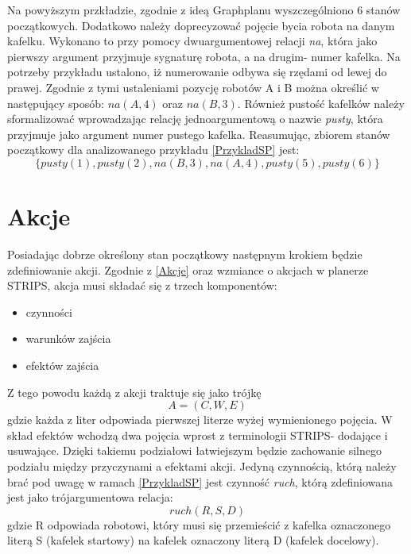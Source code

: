     Na powyższym przkładzie, zgodnie z ideą Graphplanu wyszczególniono 6 stanów początkowych. Dodatkowo należy doprecyzować pojęcie bycia robota na danym kafelku. Wykonano to 
    przy pomocy dwuargumentowej relacji \textit{na}, która jako pierwszy argument przyjmuje sygnaturę robota, a na drugim- numer kafelka. Na potrzeby przykładu ustalono, iż 
    numerowanie odbywa się rzędami od lewej do prawej. Zgodnie z tymi ustaleniami pozycję robotów A i B można określić w następujący sposób: \textit{$na(A,4)$} oraz 
    \textit{$na(B,3)$}. Również pustość kafelków należy sformalizować wprowadzając relację jednoargumentową o nazwie \textit{pusty}, która przyjmuje jako argument numer
    pustego kafelka. Reasumując, zbiorem stanów początkowy dla analizowanego przykładu \ref{PrzykladSP} jest: 
    \begin{equation}
        \{pusty(1),pusty(2),na(B,3),na(A,4),pusty(5),pusty(6)\}
        \label{ZbiorPoczatkowy}
    \end{equation}
\section{Akcje}
    \label{RozdzialAkcje}
    Posiadając dobrze określony stan początkowy następnym krokiem będzie zdefiniowanie akcji. Zgodnie z \ref{Akcje} oraz wzmiance o akcjach w planerze STRIPS,
    akcja musi składać się z trzech komponentów:
    \begin{itemize}
        \item czynności
        \item warunków zajścia
        \item efektów zajścia
    \end{itemize}
    Z tego powodu każdą z akcji traktuje się jako trójkę 
    \begin{equation}
        A=(C,W,E)
    \end{equation}
    gdzie każda z liter odpowiada pierwszej literze wyżej wymienionego pojęcia. 
    W skład efektów wchodzą dwa pojęcia wprost z terminologii STRIPS- dodające i usuwające. Dzięki takiemu podziałowi łatwiejszym będzie 
    zachowanie silnego podziału między przyczynami a efektami akcji. 
    Jedyną czynnością, którą należy brać pod uwagę w ramach \ref{PrzykladSP} jest czynność \textit{ruch}, którą zdefiniowana jest jako trójargumentowa relacja:
    \begin{equation}
        ruch(R,S,D)
    \end{equation}
    gdzie R odpowiada robotowi, który musi się przemieścić z kafelka oznaczonego literą S (kafelek startowy) na kafelek oznaczony
    literą D (kafelek docelowy).
    

